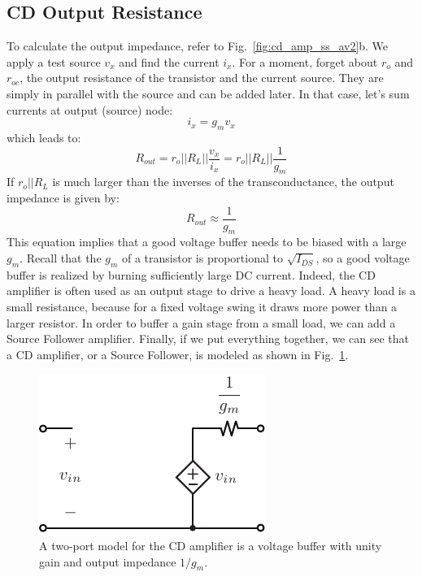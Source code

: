 \subsection{CD Output Resistance}
To calculate the output impedance, refer to Fig.~\ref{fig:cd_amp_ss_av2}b.  We apply a test source $v_x$ and find the current $i_x$.  For a moment, forget about $r_o$ and $r_{oc}$, the output resistance of the transistor and the current source.  They are simply in parallel with the source and can be added later.  In that case, let's sum currents at output (source) node:
    \begin{equation}
        {i_x} = {g_m}{v_x}
    \end{equation}
which leads to:
    \begin{equation}
        {R_{out}} = {r_o}||{R_L}||\frac{{{v_x}}}{{{i_x}}} = {r_o}||{R_L}||\frac{1}{g_m}
    \end{equation}
If $r_o || R_L$ is much larger than the inverses of the transconductance, the output impedance is given by:
    \begin{equation}
        {R_{out}} \approx \frac{1}{{{g_m}}}
    \end{equation}
This equation implies that a good voltage buffer needs to be biased with a large $g_m$.  Recall that the $g_m$ of a transistor is proportional to $\sqrt{I_{DS}}$, so a good voltage buffer is realized by burning sufficiently large DC current.  Indeed, the CD amplifier is often used as an output stage to drive a heavy load.  A heavy load is a small resistance, because for a fixed voltage swing it draws more power than a larger resistor.  In order to buffer a gain stage from a small load, we can add a Source Follower amplifier.
Finally, if we put everything together, we can see that a CD amplifier, or a Source Follower, is modeled as shown in Fig.~\ref{fig:cd_amp_model}.  
\begin{figure}[tb]
\centering
\includegraphics[scale=1]{cd_amp_model}
\caption{A two-port model for the CD amplifier is a voltage buffer with unity gain and output impedance $1/g_m$.}
\label{fig:cd_amp_model}
\end{figure}
